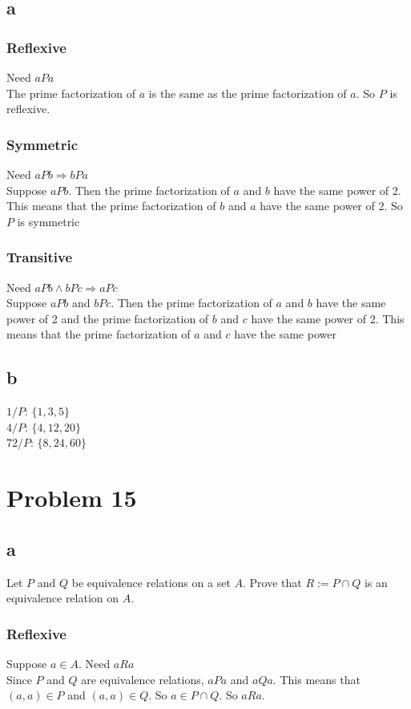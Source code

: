 \documentclass{article}
\begin{document}
\subsection*{a}
\subsubsection*{Reflexive}
Need $aPa$\\
The prime factorization of $a$ is the same as the prime factorization of $a$. So $P$ is reflexive.
\subsubsection*{Symmetric}
Need $aPb \Rightarrow bPa$\\
Suppose $aPb$. Then the prime factorization of $a$ and $b$ have the same power of 2. This means that the prime factorization of $b$ and $a$ have the same power of 2. So $P$ is symmetric
\subsubsection*{Transitive}
Need $aPb \land bPc \Rightarrow aPc$\\
Suppose $aPb$ and $bPc$. Then the prime factorization of $a$ and $b$ have the same power of 2 and the prime factorization of $b$ and $c$ have the same power of 2. This means that the prime factorization of $a$ and $c$ have the same power
\subsection*{b}
$1/P$: $\{1, 3,5 \}$\\
$4/P$: $\{4, 12,20 \}$\\
$72/P$: $\{8,24,60\}$
\section*{Problem 15}
\subsection*{a}
Let $P$ and $Q$ be equivalence relations on a set $A$. Prove that $R := P \cap Q$ is an equivalence relation on $A$.\\
\subsubsection*{Reflexive}
Suppose $a \in A$.
Need $aRa$\\
Since $P$ and $Q$ are equivalence relations, $aPa$ and $aQa$. This means that $(a,a) \in P$ and $(a,a) \in Q$. So $a \in P \cap Q$. So $aRa$.
\end{document}
